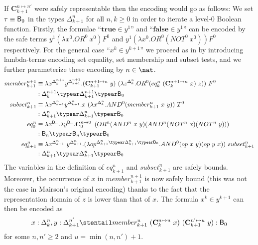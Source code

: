 If $\mathbf{C}^{n\mapsto n'}_{k+1}$ were safely representable then the encoding would go as follows: We set $\tau \equiv \mathsf{B}_0$ in the types  $\Delta_{k+1}^n$ for all $n,k\geq 0$ in order to iterate a level-$0$ Boolean function.
Firstly, the formulae ``$\mathbf{true} \in y^1$'' and ``$\mathbf{false} \in y^1$'' can be encoded by the safe terms $y^1 (\lambda x^0 . OR^0~x^0) F^0$ and $y^1 (\lambda x^0. OR^0(NOT^0~x^0)) F^0$ respectively.
For the general case ``$x^k\in y^{k+1}$''
we proceed as in \cite{mairson1992spt} by introducing lambda-terms encoding set equality, set membership and subset tests, and we further parameterize these encoding by $n\in\nat$.
\begin{align*}
member_{k+1}^{n+1} &\equiv \lambda x^{\Delta_k^{n+1}} y^{\Delta_{k+1}^{n+1}}.
(\mathbf{C}_{k+1}^{n+1\mapsto n}~y)~(\lambda z^{\Delta_k^n} . OR^0 (eq_k^n~(\mathbf{C}^{n+1\mapsto n}_k~x)~z))~F^0\\
  & : \Delta_k^{n+1} \typear \Delta_{k+1}^{n+1} \typear \booltype_0
\\
subset_{k+1}^n &\equiv \lambda x^{\Delta_{k+1}^n} y^{\Delta_{k+1}^n}.
x~(\lambda x^{\Delta_k^n} . AND^0 (member_{k+1}^n~x~y))~T^0 \\
  & : \Delta_{k+1}^n \typear \Delta_{k+1}^n \typear\booltype_0
\\
eq_0^n &\equiv \lambda x^{\booltype_n} .\lambda y^{\booltype_n}. \mathbf{C}_0^{n\mapsto 0}~ \left(OR^n (AND^n~x~y) (AND^n (NOT^n~x)(NOT^n~y))\right) \\
 &: \booltype_n \typear \booltype_n \typear\booltype_0
\\
eq_{k+1}^n &\equiv \lambda x^{\Delta_{k+1}^n}~ y^{\Delta_{k+1}^n}.
   (\lambda op^{\Delta_{k+1}^n\typear\Delta_{k+1}^n\typear\booltype_0}. AND^0 (op~x~y)(op~y~x))~subset_{k+1}^n \\
  & : \Delta_{k+1}^n \typear \Delta_{k+1}^n \typear \booltype_0
\end{align*}
The variables in the definition of $eq_{k+1}^n$ and $subset_{k+1}^n$
are safely bounds. Moreover, the occurrence of $x$ in
$member_{k+1}^{n+1}$ is now safely bound (this was not the case in
Mairson's original encoding) thanks to the fact that the
representation domain of $z$ is lower than that of $x$. The formula
$x^k\in y^{k+1}$ can then be encoded as
$$x:\Delta_k^n, y:\Delta_{k+1}^{n'}\stentail member_{k+1}^{u}~ (\mathbf{C}_k^{n\mapsto u}~x)~(\mathbf{C}^{n'\mapsto u}_{k+1} ~y) : \booltype_0$$
for some $n,n'\geq 2$ and $u = \min(n,n')+1$.

